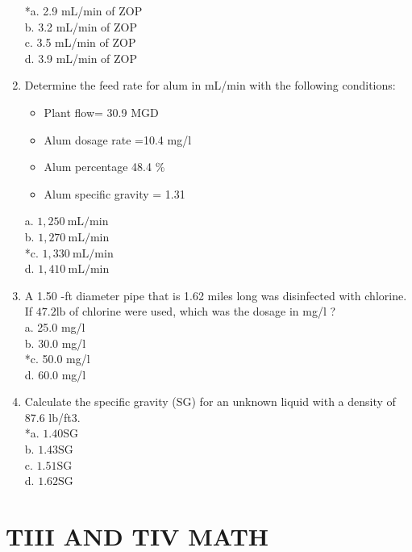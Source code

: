 \begin{enumerate}
*a. 2.9 mL/min of ZOP\\
b. 3.2 mL/min of ZOP\\
c. 3.5 mL/min of ZOP\\
d. 3.9 mL/min of ZOP\\
  \item Determine the feed rate for alum in mL/min with the following conditions:\\
\begin{itemize}
  \item Plant flow= 30.9 MGD\\
  \item Alum dosage rate =10.4 mg/l\\
  \item Alum percentage 48.4 \%\\
  \item Alum specific gravity = 1.31\\
  \end{itemize}
a. $1,250 \mathrm{~mL} / \mathrm{min}$\\
b. $1,270 \mathrm{~mL} / \mathrm{min}$\\
*c. $1,330 \mathrm{~mL} / \mathrm{min}$\\
d. $1,410 \mathrm{~mL} / \mathrm{min}$ \\
\item A 1.50 -ft diameter pipe that is 1.62 miles long was disinfected with chlorine. If $47.2 \mathrm{lb}$ of chlorine were used, which was the dosage in mg/l ?\\
a. 25.0 mg/l\\
b. 30.0 mg/l\\
*c. 50.0 mg/l\\
d. 60.0 mg/l\\
  \item Calculate the specific gravity (SG) for an unknown liquid with a density of 87.6 lb/ft3.\\
*a. $1.40 \mathrm{SG}$\\
b. $1.43 \mathrm{SG}$\\
c. $1.51 \mathrm{SG}$\\
d. $1.62 \mathrm{SG}$\\
\end{enumerate}

\newpage
\section{TIII AND TIV MATH}

